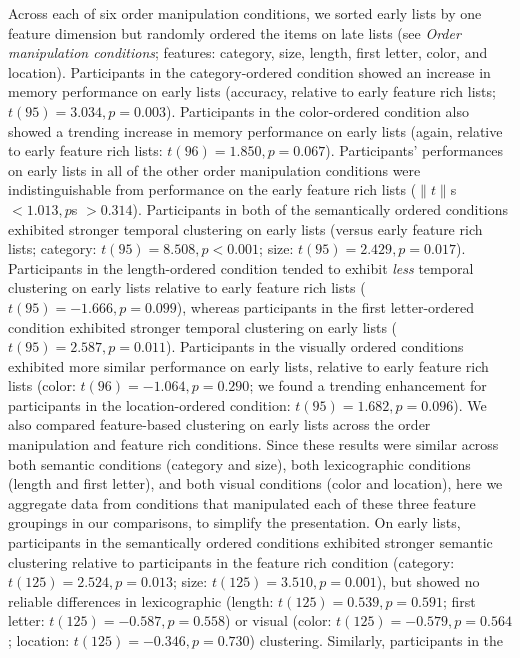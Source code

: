 \documentclass[11pt]{article}
\begin{document}
Across each of six order manipulation conditions, we sorted early lists by one
feature dimension but randomly ordered the items on late lists (see
\textit{Order manipulation conditions}; features: category, size, length, first
letter, color, and location). Participants in the category-ordered condition
showed an increase in memory performance on early lists (accuracy, relative to
early feature rich lists; $t(95) = 3.034, p = 0.003$). Participants in the
color-ordered condition also showed a trending increase in memory performance
on early lists (again, relative to early feature rich lists: $t(96) = 1.850, p
= 0.067$). Participants' performances on early lists in all of the other order
manipulation conditions were indistinguishable from performance on the early
feature rich lists ($\|t\|$s $< 1.013, p$s $> 0.314$). Participants in both of
the semantically ordered conditions exhibited stronger temporal clustering on
early lists (versus early feature rich lists; category: $t(95) = 8.508, p <
0.001$; size: $t(95) = 2.429, p = 0.017$). Participants in the length-ordered
condition tended to exhibit \textit{less} temporal clustering on early lists
relative to early feature rich lists ($t(95) = -1.666, p = 0.099$), whereas
participants in the first letter-ordered condition exhibited stronger temporal
clustering on early lists ($t(95) = 2.587, p = 0.011$). Participants in the
visually ordered conditions exhibited more similar performance on early lists,
relative to early feature rich lists (color: $t(96) = -1.064, p = 0.290$; we
found a trending enhancement for participants in the location-ordered
condition: $t(95) = 1.682, p = 0.096$). We also compared feature-based
clustering on early lists across the order manipulation and feature rich
conditions. Since these results were similar across both semantic conditions
(category and size), both lexicographic conditions (length and first letter),
and both visual conditions (color and location), here we aggregate data from
conditions that manipulated each of these three feature groupings in our
comparisons, to simplify the presentation. On early lists, participants in the
semantically ordered conditions exhibited stronger semantic clustering relative
to participants in the feature rich condition (category: $t(125) = 2.524, p =
0.013$; size: $t(125) = 3.510, p = 0.001$), but showed no reliable differences
in lexicographic (length: $t(125) = 0.539, p = 0.591$; first letter: $t(125) =
-0.587, p = 0.558$) or visual (color: $t(125) = -0.579, p = 0.564$; location:
$t(125) = -0.346, p = 0.730$) clustering. Similarly, participants in the
\end{document}
